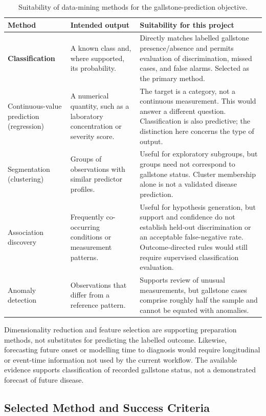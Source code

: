 \begin{table}[H]
\centering
\small
\caption{Suitability of data-mining methods for the gallstone-prediction objective.}
\label{tab:dm-family-comparison}
\begin{tabularx}{\textwidth}{@{}p{2.8cm}XX@{}}
\toprule
Method & Intended output & Suitability for this project \\
\midrule
\textbf{Classification} &
A known class and, where supported, its probability. &
Directly matches labelled gallstone presence/absence and permits evaluation
of discrimination, missed cases, and false alarms. Selected as the primary
method. \\
Continuous-value prediction (regression) &
A numerical quantity, such as a laboratory concentration or severity score. &
The target is a category, not a continuous measurement. This would answer a
different question. Classification is also predictive; the distinction here
concerns the type of output. \\
Segmentation (clustering) &
Groups of observations with similar predictor profiles. &
Useful for exploratory subgroups, but groups need not correspond to
gallstone status. Cluster membership alone is not a validated disease
prediction. \\
Association discovery &
Frequently co-occurring conditions or measurement patterns. &
Useful for hypothesis generation, but support and confidence do not establish
held-out discrimination or an acceptable false-negative rate. Outcome-directed
rules would still require supervised classification evaluation. \\
Anomaly detection &
Observations that differ from a reference pattern. &
Supports review of unusual measurements, but gallstone cases comprise roughly
half the sample and cannot be equated with anomalies. \\
\bottomrule
\end{tabularx}
\end{table}

Dimensionality reduction and feature selection are supporting preparation
methods, not substitutes for predicting the labelled outcome. Likewise,
forecasting future onset or modelling time to diagnosis would require
longitudinal or event-time information not used by the current workflow.
The available evidence supports classification of recorded gallstone status,
not a demonstrated forecast of future disease.

\subsection{Selected Method and Success Criteria}
\label{subsec:dm-method-decision}


